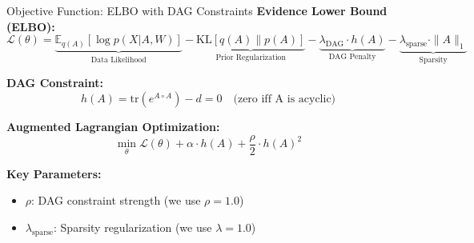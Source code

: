 \documentclass[aspectratio=169]{beamer}
\begin{document}
\begin{frame}{Objective Function: ELBO with DAG Constraints}
\textbf{Evidence Lower Bound (ELBO):}
\begin{equation*}
\mathcal{L}(\theta) = \underbrace{\mathbb{E}_{q(A)}[\log p(X|A,W)]}_{\text{Data Likelihood}} - \underbrace{\text{KL}[q(A) \| p(A)]}_{\text{Prior Regularization}} - \underbrace{\lambda_{\text{DAG}} \cdot h(A)}_{\text{DAG Penalty}} - \underbrace{\lambda_{\text{sparse}} \cdot \|A\|_1}_{\text{Sparsity}}
\end{equation*}

\vspace{0.3cm}
\textbf{DAG Constraint:}
\begin{equation*}
h(A) = \text{tr}(e^{A \circ A}) - d = 0 \quad \text{(zero iff A is acyclic)}
\end{equation*}

\vspace{0.3cm}
\textbf{Augmented Lagrangian Optimization:}
\begin{equation*}
\min_{\theta} \mathcal{L}(\theta) + \alpha \cdot h(A) + \frac{\rho}{2} \cdot h(A)^2
\end{equation*}

\vspace{0.2cm}
\textbf{Key Parameters:}
\begin{itemize}
    \item $\rho$: DAG constraint strength (we use $\rho=1.0$)
    \item $\lambda_{\text{sparse}}$: Sparsity regularization (we use $\lambda=1.0$)
\end{itemize}
\end{frame}
\end{document}
